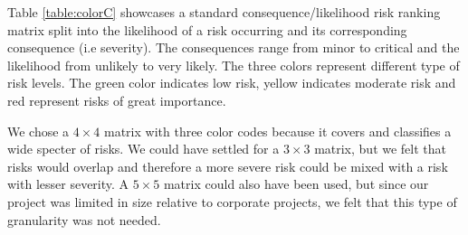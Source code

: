 \begin{table}[h]
\caption{Consequence and likelihood color coding risk matrix.}
\label{table:colorC}
\end{table}

Table \ref{table:colorC} showcases a standard consequence/likelihood risk ranking matrix split into the likelihood of a risk occurring and its corresponding consequence (i.e severity). The consequences range from minor to critical and the likelihood from unlikely to very likely. The three colors represent different type of risk levels. The green color indicates low risk, yellow indicates moderate risk and red represent risks of great importance. 

We chose a $4\times4$ matrix with three color codes because it covers and classifies a wide specter of risks. We could have settled for a $3\times3$ matrix, but we felt that risks would overlap and therefore a more severe risk could be mixed with a risk with lesser severity. A $5\times5$ matrix could also have been used, but since our project was limited in size relative to corporate projects, we felt that this type of granularity was not needed. 

